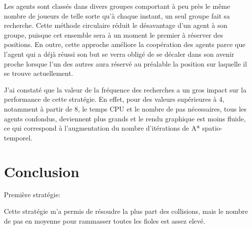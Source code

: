 \documentclass[letterpaper]{article}
\begin{document}
Les agents sont class\'es dans divers groupes comportant \`a peu pr\`es le m\^eme nombre de joueurs de telle sorte qu'\`a chaque instant, un seul groupe fait sa recherche. 
Cette m\'ethode circulaire r\'eduit le d\'esavantage d'un agent \`a son groupe, puisque cet ensemble sera \`a un moment le premier \`a r\'eserver des positions.
En outre, cette approche am\'eliore la coop\'eration des agents parce que l'agent qui a d\'ej\`a r\'eussi son but se verra oblig\'e de se d\'ecaler dans son avenir proche lorsque l'un des autres aura r\'eserv\'e au pr\'ealable la position sur laquelle il se trouve actuellement.

J'ai constat\'e que la valeur de la fr\'equence des recherches a un gros impact sur la performance de cette strat\'egie.
En effet, pour des valeurs sup\'erieures \`a 4, notamment \`a partir de 8, le temps CPU et le nombre de pas n\'ecessaires, tous les agents confondus, deviennent plus grands et le rendu graphique est moins fluide, ce qui correspond \`a l'augmentation du nombre d'it\'erations de A* spatio-temporel.

\section{Conclusion}
Premi\`ere strat\'egie:

Cette strat\'egie m'a permis de r\'esoudre la plus part des collisions, mais le nombre de pas en moyenne pour rammasser toutes les fioles est assez elev\'e.
\end{document}
